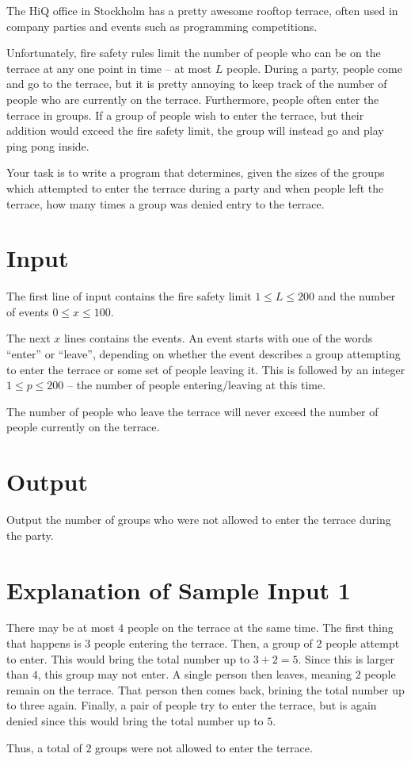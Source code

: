 The HiQ office in Stockholm has a pretty awesome rooftop terrace, often used in company parties and events such as programming competitions.

Unfortunately, fire safety rules limit the number of people who can be on the terrace at any one point in time -- at most $L$ people.
During a party, people come and go to the terrace, but it is pretty annoying to keep track of the number of people who are currently on the terrace. Furthermore, people often enter the terrace in groups. If a group of people wish to enter the terrace, but their addition would exceed the fire safety limit, the group will instead go and play ping pong inside.

Your task is to write a program that determines, given the sizes of the groups which attempted to enter the terrace during a party and when people left the terrace, how many times a group was denied entry to the terrace.

\section*{Input}
The first line of input contains the fire safety limit $1 \le L \le 200$ and the number of events $0 \le x \le 100$.

The next $x$ lines contains the events.
An event starts with one of the words ``enter'' or ``leave'', depending on whether the event describes a group attempting to enter the terrace or some set of people leaving it.
This is followed by an integer $1 \le p \le 200$ -- the number of people entering/leaving at this time.

The number of people who leave the terrace will never exceed the number of people currently on the terrace.

\section*{Output}
Output the number of groups who were not allowed to enter the terrace during the party.

\section*{Explanation of Sample Input 1}
There may be at most $4$ people on the terrace at the same time.
The first thing that happens is $3$ people entering the terrace.
Then, a group of $2$ people attempt to enter.
This would bring the total number up to $3 + 2 = 5$.
Since this is larger than $4$, this group may not enter.
A single person then leaves, meaning $2$ people remain on the terrace.
That person then comes back, brining the total number up to three again.
Finally, a pair of people try to enter the terrace, but is again denied since this would bring the total number up to $5$.

Thus, a total of $2$ groups were not allowed to enter the terrace.
